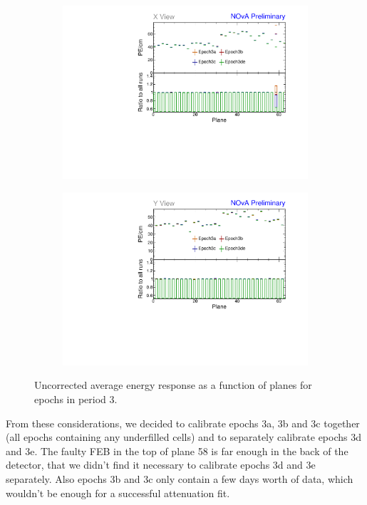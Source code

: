 \begin{figure}[!hbtp]
\centering
\begin{subfigure}[b]{0.495\textwidth}
\centering
\includegraphics[width=\textwidth]{PlotsTBCalibTechnote/Attenprofs_P3Data_PlanePE_X_Combined.pdf}
\end{subfigure}
\begin{subfigure}[b]{0.495\textwidth}
\centering
\includegraphics[width=\textwidth]{PlotsTBCalibTechnote/Attenprofs_P3Data_PlanePE_Y_Combined.pdf}
\end{subfigure}
\caption{Uncorrected average energy response as a function of planes for epochs in period 3.}
\label{fig:CalibhistPlanePE_period3}
\end{figure}

From these considerations, we decided to calibrate epochs 3a, 3b and 3c together (all epochs containing any underfilled cells) and to separately calibrate epochs 3d and 3e. The faulty FEB in the top of plane 58 is far enough in the back of the detector, that we didn't find it necessary to calibrate epochs 3d and 3e separately. Also epochs 3b and 3c only contain a few days worth of data, which wouldn't be enough for a successful attenuation fit.

